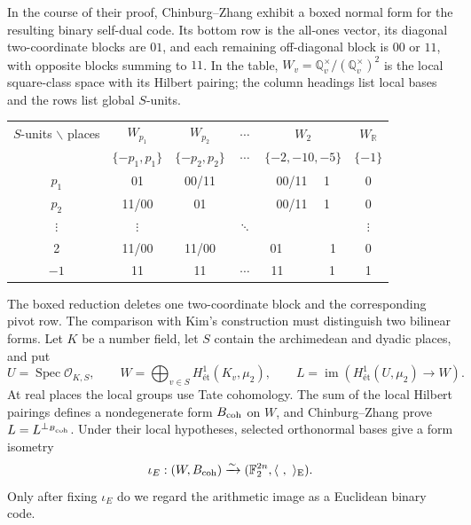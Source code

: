 \documentclass[12pt]{article}
\newcommand{\et}{\mathrm{ét}}
\begin{document}
In the course of their proof, Chinburg--Zhang exhibit a boxed normal form
for the resulting binary self-dual code. Its bottom row is the all-ones
vector, its diagonal two-coordinate blocks are \(01\), and each remaining
off-diagonal block is \(00\) or \(11\), with opposite blocks summing to
\(11\). In the table, \(W_v=\mathbb Q_v^\times/(\mathbb Q_v^\times)^2\)
is the local square-class space with its Hilbert pairing; the column
headings list local bases and the rows list global \(S\)-units.

\begin{center}
\begin{tabular}{|c|ccccc|}
\toprule
$S$-units $\backslash$  places & $W_{p_1}$  & $W_{p_2}$ & $\cdots$ & $W_2$  & $W_{\mathbb R}$ \\
 & $\{-p_1, p_1\}$ & $\{-p_2, p_2\}$ & $\cdots$  & $\{-2, -10, -5 \}$ & $\{-1 \}$  \\
\midrule
$p_1$  & 01   & 00/11  &  & 00/11 ~~1  &  0 \\
$p_2$  & 11/00   & 01  &  & 00/11 ~~1  &  0 \\
$\vdots$ & $\vdots$ &   &  $\ddots$ &   & $\vdots$ \\
2  & 11/00   & 11/00  &   & 01 ~~~~~~~1  &  0 \\
$-1$ & 11      & 11 & $\cdots$ & 11 ~~~~~~ 1 &  1 \\
\bottomrule
\end{tabular}
\end{center}

The boxed reduction deletes one two-coordinate block and the corresponding
pivot row. The comparison with Kim's construction must distinguish two
bilinear forms. Let \(K\) be a number field, let \(S\) contain the
archimedean and dyadic places, and put
\[
U=\operatorname{Spec}\mathcal O_{K,S},\qquad
W=\bigoplus_{v\in S}H^1_{\et}(K_v,\mu_2),\qquad
L=\operatorname{im}\!\left(H^1_{\et}(U,\mu_2)\longrightarrow W\right).
\]
At real places the local groups use Tate cohomology. The sum of the local
Hilbert pairings defines a nondegenerate form \(B_{\rm coh}\) on \(W\),
and Chinburg--Zhang prove \(L=L^{\perp_{B_{\rm coh}}}\). Under their local
hypotheses, selected orthonormal bases give a form isometry
\[
\iota_E:(W,B_{\rm coh})\xrightarrow{\sim}
(\mathbb F_2^{2n},\langle\ ,\ \rangle_{\rm E}).
\]
Only after fixing \(\iota_E\) do we regard the arithmetic image as a
Euclidean binary code.
\end{document}
